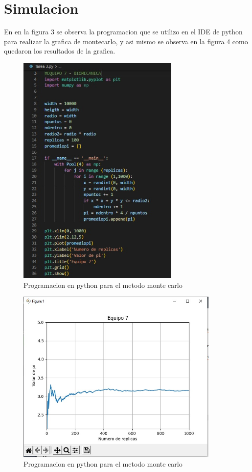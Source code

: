\documentclass{article}
\begin{document}
\section{Simulacion}
\item
En en la figura 3 se observa la programacion que se utilizo en el IDE de python para realizar la grafica de montecarlo, y asi mismo se observa en la figura 4 como quedaron los resultados de la grafica.

\begin{figure} %
    \centering
    \includegraphics[width=80mm]{Programacion.jpg} %
    \caption{Programacion en python para el metodo monte carlo}
    \label{programa}
\end{figure}

\begin{figure} %
    \centering
    \includegraphics[width=100mm]{Grafica.jpg} %
    \caption{Programacion en python para el metodo monte carlo}
    \label{grafica}
\end{figure}
\end{document}
